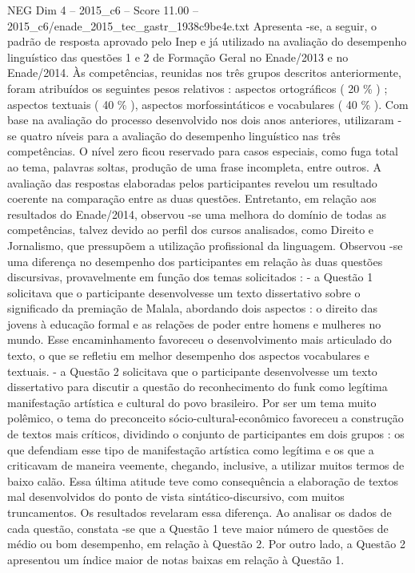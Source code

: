 \begin{textsample}{NEG Dim 4 – 2015\_c6 – Score 11.00 – 2015\_c6/enade\_2015\_tec\_gastr\_1938c9be4e.txt}
Apresenta -se, a seguir, o padrão de resposta aprovado pelo Inep e já utilizado na avaliação do desempenho linguístico das questões 1 e 2 de Formação Geral no Enade/2013 e no Enade/2014.
Às competências, reunidas nos três grupos descritos anteriormente, foram atribuídos os seguintes pesos relativos : aspectos ortográficos ( 20 \% ) ; aspectos textuais ( 40 \% ), aspectos morfossintáticos e vocabulares ( 40 \% ).
Com base na avaliação do processo desenvolvido nos dois anos anteriores, utilizaram -se quatro níveis para a avaliação do desempenho linguístico nas três competências.
O nível zero ficou reservado para casos especiais, como fuga total ao tema, palavras soltas, produção de uma frase incompleta, entre outros.
A avaliação das respostas elaboradas pelos participantes revelou um resultado coerente na comparação entre as duas questões.
Entretanto, em relação aos resultados do Enade/2014, observou -se uma melhora do domínio de todas as competências, talvez devido ao perfil dos cursos analisados, como Direito e Jornalismo, que pressupõem a utilização profissional da linguagem.
Observou -se uma diferença no desempenho dos participantes em relação às duas questões discursivas, provavelmente em função dos temas solicitados : - a Questão 1 solicitava que o participante desenvolvesse um texto dissertativo sobre o significado da premiação de Malala, abordando dois aspectos : o direito das jovens à educação formal e as relações de poder entre homens e mulheres no mundo.
Esse encaminhamento favoreceu o desenvolvimento mais articulado do texto, o que se refletiu em melhor desempenho dos aspectos vocabulares e textuais. - a Questão 2 solicitava que o participante desenvolvesse um texto dissertativo para discutir a questão do reconhecimento do funk como legítima manifestação artística e cultural do povo brasileiro.
Por ser um tema muito polêmico, o tema do preconceito sócio-cultural-econômico favoreceu a construção de textos mais críticos, dividindo o conjunto de participantes em dois grupos : os que defendiam esse tipo de manifestação artística como legítima e os que a criticavam de maneira veemente, chegando, inclusive, a utilizar muitos termos de baixo calão.
Essa última atitude teve como consequência a elaboração de textos mal desenvolvidos do ponto de vista sintático-discursivo, com muitos truncamentos.
Os resultados revelaram essa diferença.
Ao analisar os dados de cada questão, constata -se que a Questão 1 teve maior número de questões de médio ou bom desempenho, em relação à Questão 2.
Por outro lado, a Questão 2 apresentou um índice maior de notas baixas em relação à Questão 1.

\end{textsample}
